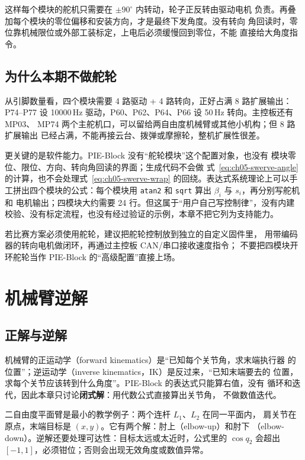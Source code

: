 这样每个模块的舵机只需要在 $\pm90^\circ$ 内转动，轮子正反转由驱动电机
负责。再叠加每个模块的零位偏移和安装方向，才是最终下发角度。没有转向
角回读时，零位靠机械限位或外部工装标定，上电后必须缓慢回到零位，不能
直接给大角度指令。

\subsection{为什么本期不做舵轮}

从引脚数量看，四个模块需要 4 路驱动 + 4 路转向，正好占满 8 路扩展输出：
P74--P77 设 10000\,Hz 驱动，P60、P62、P64、P66 设 50\,Hz 转向。主控板还有 MP03、
MP74 两个主舵机口，可以留给两自由度机械臂或其他小机构；但 8 路扩展输出
已经占满，不能再接云台、拨弹或摩擦轮，整机扩展性很差。

更关键的是软件能力。PIE-Block 没有“舵轮模块”这个配置对象，也没有
模块零位、限位、方向、转向角回读的界面；生成代码不会做
式~\eqref{eq:ch05-swerve-angle} 的计算，也不会处理式~\eqref{eq:ch05-swerve-wrap}
的回绕。表达式系统理论上可以手工拼出四个模块的公式：每个模块用
\texttt{atan2} 和 \texttt{sqrt} 算出 $\beta_i$ 与 $s_i$，再分别写舵机和
电机输出；四模块大约需要 24 行。但这属于“用户自己写控制律”，没有内建
校验、没有标定流程，也没有经过验证的示例，本章不把它列为支持能力。

\begin{note}
若比赛方案必须使用舵轮，建议把舵轮控制放到独立的自定义固件里，
用带编码器的转向电机做闭环，再通过主控板 CAN/串口接收速度指令；
不要把四模块开环舵轮当作 PIE-Block 的“高级配置”直接上场。
\end{note}

\section{机械臂逆解}

\subsection{正解与逆解}

机械臂的正运动学（forward kinematics）是“已知每个关节角，求末端执行器
的位置”；逆运动学（inverse kinematics，IK）是反过来，“已知末端要去的
位置，求每个关节应该转到什么角度”。PIE-Block 的表达式只能算右值，没有
循环和迭代，因此本章只讨论\textbf{闭式解}：用代数公式直接算出关节角，
不做数值迭代。

二自由度平面臂是最小的教学例子：两个连杆 $L_1$、$L_2$ 在同一平面内，
肩关节在原点，末端目标是 $(x,y)$。它有两个解：肘上（elbow-up）和肘下
（elbow-down）。逆解还要处理可达性：目标太远或太近时，公式里的
$\cos q_2$ 会超出 $[-1,1]$，必须钳位；否则会出现无效角度或数值异常。

